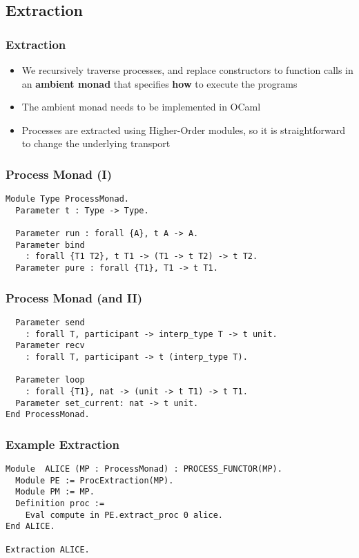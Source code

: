 \subsection{Extraction}

\begin{frame}[fragile]
\frametitle{Extraction}
\begin{itemize}
\item We recursively traverse processes, and replace constructors to function calls in an \textbf{ambient monad} that specifies \textbf{how} to execute the programs
\item The ambient monad needs to be implemented in OCaml
\item Processes are extracted using Higher-Order modules, so it is straightforward to change the underlying
transport
\end{itemize}
\end{frame}

\begin{frame}[fragile]
\frametitle{Process Monad (I)}
\begin{verbatim}
Module Type ProcessMonad.
  Parameter t : Type -> Type.

  Parameter run : forall {A}, t A -> A.
  Parameter bind 
    : forall {T1 T2}, t T1 -> (T1 -> t T2) -> t T2.
  Parameter pure : forall {T1}, T1 -> t T1.
\end{verbatim}
\end{frame}

\begin{frame}[fragile]
\frametitle{Process Monad (and II)}
\begin{verbatim}
  Parameter send 
    : forall T, participant -> interp_type T -> t unit.
  Parameter recv
    : forall T, participant -> t (interp_type T).

  Parameter loop 
    : forall {T1}, nat -> (unit -> t T1) -> t T1.
  Parameter set_current: nat -> t unit.
End ProcessMonad.
\end{verbatim}
\end{frame}

\begin{frame}[fragile]
\frametitle{Example Extraction}
\begin{verbatim}
Module  ALICE (MP : ProcessMonad) : PROCESS_FUNCTOR(MP).
  Module PE := ProcExtraction(MP).
  Module PM := MP.
  Definition proc :=
    Eval compute in PE.extract_proc 0 alice.
End ALICE.

Extraction ALICE.
\end{verbatim}
\end{frame}

